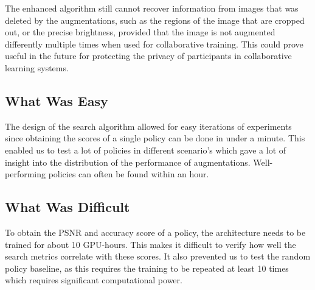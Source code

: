The enhanced algorithm still cannot recover information from images that was deleted by the augmentations, such as the regions of the image that are cropped out, or the precise brightness, provided that the image is not augmented differently multiple times when used for collaborative training. This could prove useful in the future for protecting the privacy of participants in collaborative learning systems.

\subsection{What Was Easy}
The design of the search algorithm allowed for easy iterations of experiments since obtaining the scores of a single policy can be done in under a minute. This enabled us to test a lot of policies in different scenario's which gave a lot of insight into the distribution of the performance of augmentations. Well-performing policies can often be found within an hour.

\subsection{What Was Difficult}

To obtain the PSNR and accuracy score of a policy, the architecture needs to be trained for about 10 GPU-hours. This makes it difficult to verify how well the search metrics correlate with these scores. It also prevented us to test the random policy baseline, as this requires the training to be repeated at least 10 times which requires significant computational power.

